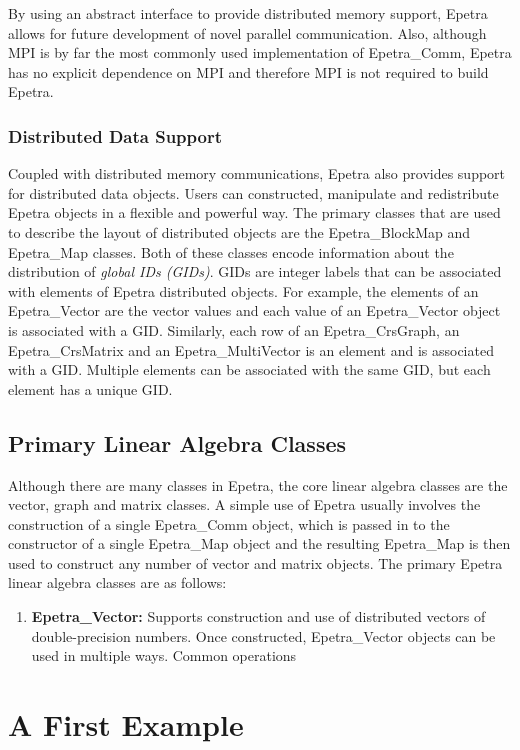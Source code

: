 \documentclass[12pt,relax]{EpetraUserGuide}
\newcommand{\comm}{Epetra\_Comm}
\newcommand{\map}{Epetra\_Map}
\newcommand{\blockmap}{Epetra\_BlockMap}
\renewcommand{\vector}{Epetra\_Vector}
\newcommand{\multivector}{Epetra\_MultiVector}
\newcommand{\crsgraph}{Epetra\_CrsGraph}
\newcommand{\crsmatrix}{Epetra\_CrsMatrix}
\begin{document}
By using an abstract interface to provide distributed memory support,
Epetra allows for future development of novel parallel communication.
Also, although MPI is by far the most commonly used implementation of
\comm{}, Epetra has no explicit dependence on MPI and therefore MPI is
not required to build Epetra.

\subsubsection{Distributed Data Support}

Coupled with distributed memory communications, Epetra also provides
support for distributed data objects.  Users can constructed,
manipulate and redistribute Epetra objects in a flexible and powerful
way.  The primary classes that are used to describe the layout of
distributed objects are the \blockmap{} and \map{} classes.  Both of
these classes encode information about the distribution of {\it global
IDs (GIDs)}. GIDs are integer labels that can be associated
with elements of  Epetra distributed objects.  For example, the
elements of an \vector{} are the vector values and each
value of an \vector{} object is associated with a GID.
Similarly, each row of an \crsgraph{}, an \crsmatrix{} and an
\multivector{} is an element and is associated with a GID.  Multiple
elements can be associated with the same GID, but each element has a
unique GID.

\subsection{Primary Linear Algebra Classes}
Although there are many classes in Epetra, the core linear algebra classes are the
vector, graph and matrix classes.  A simple use of Epetra usually
involves the construction of a single \comm{} object, which is passed
in to the constructor of a single \map{} object and the resulting \map{}
is then used to construct any number of vector and matrix objects.
The primary Epetra linear algebra classes are as follows:
\begin{enumerate}
\item {\bf \vector{}: } Supports construction and use of distributed
vectors of double-precision numbers.  Once constructed, \vector{}
objects can be used in multiple ways.  Common operations

\end{enumerate}

\section{A First Example}
\end{document}
